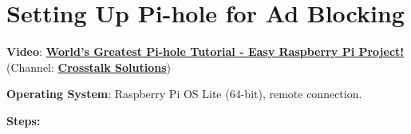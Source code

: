 \section{Setting Up Pi-hole for Ad Blocking}

\noindent \textbf{Video}: \href{https://www.youtube.com/watch?v=cE21YjuaB6o}{\textbf{\color{blue}World's Greatest Pi-hole Tutorial - Easy Raspberry Pi Project!}} (Channel: \href{https://www.youtube.com/@CrosstalkSolutions}{\textbf{\color{blue}Crosstalk Solutions}})

\vspace{0.5cm}

\noindent \textbf{Operating System}: Raspberry Pi OS Lite (64-bit), remote connection.

\vspace{0.5cm}

\noindent \textbf{Steps:}

